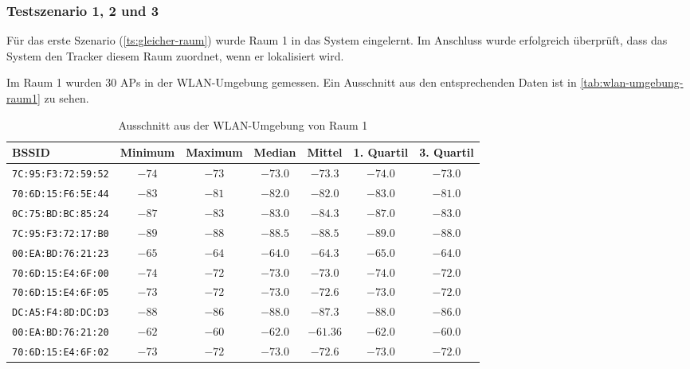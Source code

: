 \FloatBarrier

\subsubsection{Testszenario 1, 2 und 3}

Für das erste Szenario (\ref{ts:gleicher-raum}) wurde Raum 1 in das System eingelernt. Im Anschluss
wurde erfolgreich überprüft, dass das System den Tracker diesem Raum zuordnet, wenn er lokalisiert
wird.

Im Raum 1 wurden $30$ \glspl{AP} in der \gls{WLAN}-Umgebung gemessen. Ein Ausschnitt aus den
entsprechenden Daten ist in \autoref{tab:wlan-umgebung-raum1} zu sehen.

\begin{table}[htbp]
	\def\arraystretch{1.1}
	\centering
	\begin{tabular}{l c c c c c c}
		\gls{BSSID}	 & Minimum & Maximum & Median & Mittel & 1. Quartil & 3. Quartil \\ \hline
		\texttt{7C:95:F3:72:59:52} & $-74$     & $-73$     & $-73.0$  & $-73.3$  & $-74.0$ & $-73.0$ \\
		\texttt{70:6D:15:F6:5E:44} & $-83$     & $-81$     & $-82.0$  & $-82.0$  & $-83.0$ & $-81.0$ \\
		\texttt{0C:75:BD:BC:85:24} & $-87$     & $-83$     & $-83.0$  & $-84.3$  & $-87.0$ & $-83.0$ \\
		\texttt{7C:95:F3:72:17:B0} & $-89$     & $-88$     & $-88.5$  & $-88.5$  & $-89.0$ & $-88.0$ \\
		\texttt{00:EA:BD:76:21:23} & $-65$     & $-64$     & $-64.0$  & $-64.3$  & $-65.0$ & $-64.0$ \\
		\texttt{70:6D:15:E4:6F:00} & $-74$     & $-72$     & $-73.0$  & $-73.0$  & $-74.0$ & $-72.0$ \\
		\texttt{70:6D:15:E4:6F:05} & $-73$     & $-72$     & $-73.0$  & $-72.6$  & $-73.0$ & $-72.0$ \\
		\texttt{DC:A5:F4:8D:DC:D3} & $-88$     & $-86$     & $-88.0$  & $-87.3$  & $-88.0$ & $-86.0$ \\
		\texttt{00:EA:BD:76:21:20} & $-62$     & $-60$     & $-62.0$  & $-61.36$ & $-62.0$ & $-60.0$ \\
		\texttt{70:6D:15:E4:6F:02} & $-73$     & $-72$     & $-73.0$  & $-72.6$  & $-73.0$ & $-72.0$ \\
	\end{tabular}
	\caption{Ausschnitt aus der \gls{WLAN}-Umgebung von Raum 1}
	\label{tab:wlan-umgebung-raum1}
\end{table}

